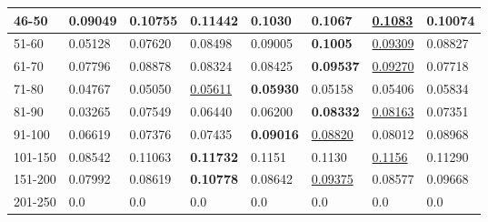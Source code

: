\begin{table*}[]
\begin{tabular}{|l|l|l|l|l|l|l||l|}
        46-50   & 0.09049                        & 0.10755                        & \textbf{0.11442}               & 0.1030                         & 0.1067                         & \underline{0.1083}              & 0.10074                    \\ \hline
        51-60   & 0.05128                        & 0.07620                        & 0.08498                        & 0.09005                        & \textbf{0.1005}                & \underline{0.09309}             & 0.08827                    \\ \hline
        61-70   & 0.07796                        & 0.08878                        & 0.08324                        & 0.08425                        & \textbf{0.09537}               & \underline{0.09270}             & 0.07718                    \\ \hline
        71-80   & 0.04767                        & 0.05050                        & \underline{0.05611}            & \textbf{0.05930}               & 0.05158                        & 0.05406                         & 0.05834                    \\ \hline
        81-90   & 0.03265                        & 0.07549                        & 0.06440                        & 0.06200                        & \textbf{0.08332}               & \underline{0.08163}             & 0.07351                    \\ \hline
        91-100  & 0.06619                        & 0.07376                        & 0.07435                        & \textbf{0.09016}               & \underline{0.08820}            & 0.08012                         & 0.08968                    \\ \hline
        101-150 & 0.08542                        & 0.11063                        & \textbf{0.11732}               & 0.1151                         & 0.1130                         & \underline{0.1156}              & 0.11290                    \\ \hline
        151-200 & 0.07992                        & 0.08619                        & \textbf{0.10778}               & 0.08642                        & \underline{0.09375}            & 0.08577                         & 0.09668                    \\ \hline
        201-250 & 0.0                            & 0.0                            & 0.0                            & 0.0                            & 0.0                            & 0.0                             & 0.0                        \\ \hline

\end{tabular}
\end{table*}
